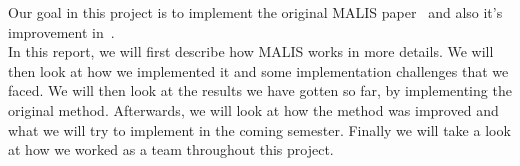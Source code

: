 Our goal in this project is to implement the original MALIS
paper~\cite{turaga_maximin_2009} and also it's improvement
in~\cite{funke_large_2019}.\\

In this report, we will first describe how MALIS works in more details. We will
then look at how we implemented it and some implementation challenges that we
faced. We will then look at the results we have gotten so far, by implementing
the original method. Afterwards, we will look at how the method was improved
and what we will try to implement in the coming semester. Finally we will take
a look at how we worked as a team throughout this project.

